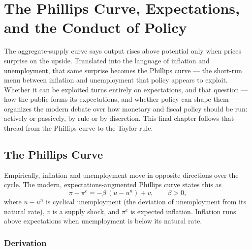 \chapter{The Phillips Curve, Expectations, and the Conduct of Policy}
\label{ch:phillips}

The aggregate-supply curve says output rises above potential only when prices surprise on the upside. Translated into the language of inflation and unemployment, that same surprise becomes the Phillips curve --- the short-run menu between inflation and unemployment that policy appears to exploit. Whether it can be exploited turns entirely on expectations, and that question --- how the public forms its expectations, and whether policy can shape them --- organizes the modern debate over how monetary and fiscal policy should be run: actively or passively, by rule or by discretion. This final chapter follows that thread from the Phillips curve to the Taylor rule.

\section{The Phillips Curve}

Empirically, inflation and unemployment move in opposite directions over the cycle. The modern, expectations-augmented Phillips curve states this as
\[
\pi - \pi^{e} = -\beta\,(u - u^{n}) + v, \qquad \beta>0,
\]
where $u-u^{n}$ is cyclical unemployment (the deviation of unemployment from its natural rate), $v$ is a supply shock, and $\pi^{e}$ is expected inflation. Inflation runs above expectations when unemployment is below its natural rate.


\subsection{Derivation}

